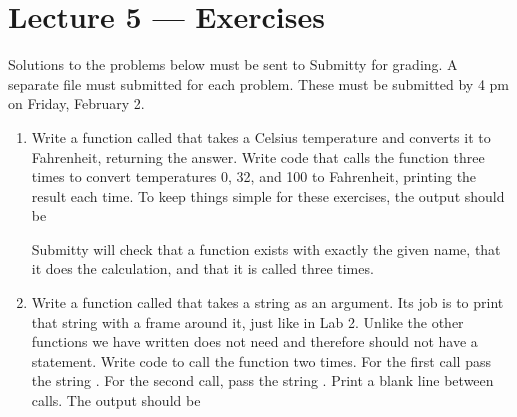 \documentclass[letterpaper,10pt,english]{sphinxmanual}
\begin{document}
\chapter{Lecture 5 — Exercises}
\label{\detokenize{lecture_notes/lec05_functions2_exercises/exercises:lecture-5-exercises}}\label{\detokenize{lecture_notes/lec05_functions2_exercises/exercises::doc}}
Solutions to the problems below must be sent to Submitty for grading.
A separate file must submitted for each problem.  These must be
submitted by 4 pm on Friday, February 2.
\begin{enumerate}
\item {} 
Write a function called  that takes a Celsius
temperature and converts it to Fahrenheit, returning the answer.
Write code that calls the function three times to convert
temperatures 0, 32, and 100 to Fahrenheit, printing the result each
time.  To keep things simple for these exercises, the output should
be

%
\begin{sphinxVerbatim}[commandchars=\\\{\}]
  
  
  
\end{sphinxVerbatim}

Submitty will check that a function exists with exactly the given
name, that it does the calculation, and that it is called three
times.

\item {} 
Write a function called  that takes a string as an
argument.  Its job is to print that string with a frame around it,
just like in Lab 2.  Unlike the other functions we have written
 does not need and therefore should not have a
 statement.  Write code to call the function two times.
For the first call pass the string .  For the
second call, pass the string .  Print a blank line between
calls.  The output should be

%
\begin{sphinxVerbatim}[commandchars=\\\{\}]
   


\end{sphinxVerbatim}
\end{enumerate}
\end{document}
